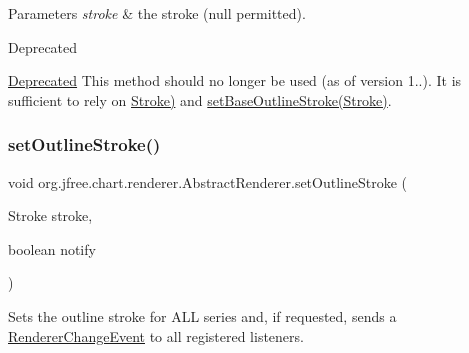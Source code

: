 \begin{DoxyParams}{Parameters}
{\em stroke} & the stroke ({\ttfamily null} permitted).\\
\hline
\end{DoxyParams}
\begin{DoxyRefDesc}{Deprecated}
\item[\mbox{\hyperlink{deprecated__deprecated000124}{Deprecated}}]This method should no longer be used (as of version 1..). It is sufficient to rely on \mbox{\hyperlink{}{Stroke)}} and \mbox{\hyperlink{classorg_1_1jfree_1_1chart_1_1renderer_1_1_abstract_renderer_a8626e74d5ba48c73c39af03b289ea7a0}{set\+Base\+Outline\+Stroke(\+Stroke)}}. \end{DoxyRefDesc}
\mbox{\label{classorg_1_1jfree_1_1chart_1_1renderer_1_1_abstract_renderer_a4f54e760f281e2643ebab8f182214212}} 
\subsubsection{\texorpdfstring{set\+Outline\+Stroke()}{setOutlineStroke()}\hspace{0.1cm}{\footnotesize\ttfamily [2/2]}}
{\footnotesize\ttfamily void org.\+jfree.\+chart.\+renderer.\+Abstract\+Renderer.\+set\+Outline\+Stroke (\begin{DoxyParamCaption}\item[{Stroke}]{stroke,  }\item[{boolean}]{notify }\end{DoxyParamCaption})}

Sets the outline stroke for A\+LL series and, if requested, sends a \mbox{\hyperlink{}{Renderer\+Change\+Event}} to all registered listeners.


